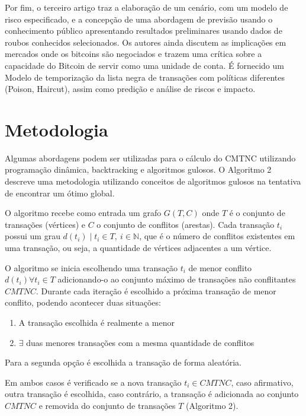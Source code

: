 \documentclass[conference]{IEEEtran}
\begin{document}
Por fim, o terceiro artigo traz a elaboração de um cenário, com um modelo de risco especificado, e a concepção de uma abordagem de previsão usando o conhecimento público apresentando resultados preliminares usando dados de roubos conhecidos selecionados. Os autores ainda discutem as implicações em mercados onde os bitcoins são negociados e trazem uma crítica sobre a capacidade do Bitcoin de servir como uma unidade de conta. É fornecido um Modelo de temporização da lista negra de transações com políticas diferentes (Poison, Haircut), assim como predição e análise de riscos e impacto.



\section{Metodologia}

Algumas abordagens podem ser utilizadas para o cálculo do CMTNC utilizando programação dinâmica, backtracking e algoritmos gulosos. O Algoritmo 2 descreve uma metodologia utilizando conceitos de algoritmos gulosos na tentativa de encontrar um ótimo global.

O algoritmo recebe como entrada um grafo $G(T,C)$ onde $T$ é o conjunto de transações (vértices) e $C$ o conjunto de conflitos (arestas). Cada transação $t_i$ possui um grau $d(t_i) \mid t_i \in T,\ i \in \mathbb{N}$, que é o número de conflitos existentes em uma transação, ou seja, a quantidade de vértices adjacentes a um vértice.

O algoritmo se inicia escolhendo uma transação $t_i$ de menor conflito $d(t_i) \forall t_i \in T$ adicionando-o ao conjunto máximo de transações não conflitantes $CMTNC$. Durante cada iteração é escolhido a próxima transação de menor conflito, podendo acontecer duas situações:

\begin{enumerate}
    \item A transação escolhida é realmente a menor
    \item $\exists$ duas menores transações com a mesma quantidade de conflitos
\end{enumerate}

Para a segunda opção é escolhida a transação de forma aleatória.

Em ambos casos é verificado se a nova transação $t_i \in CMTNC$, caso afirmativo, outra transação é escolhida, caso contrário, a transação é adicionada ao conjunto $CMTNC$ e removida do conjunto de transações $T$ (Algoritmo 2).
\end{document}
